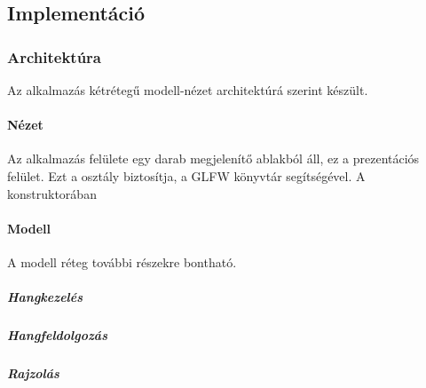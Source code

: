 
\subsection{Implement\'aci\'o}

\subsubsection{Architekt\'ura}
Az alkalmaz\'as k\'etr\'eteg\H u modell-n\'ezet architekt\'ur\'a szerint k\'esz\"ult.

\paragraph{N\'ezet}
Az alkalmaz\'as fel\"ulete egy darab megjelen\'it\H o ablakb\'ol \'all, ez a prezent\'aci\'os fel\"ulet.
Ezt a  oszt\'aly biztos\'itja, a GLFW k\"onyvt\'ar seg\'its\'eg\'evel.
A konstruktor\'aban %

\paragraph{Modell}
A modell r\'eteg tov\'abbi r\'eszekre bonthat\'o.
\subparagraph{Hangkezel\'es}

\subparagraph{Hangfeldolgoz\'as}

\subparagraph{Rajzol\'as}
